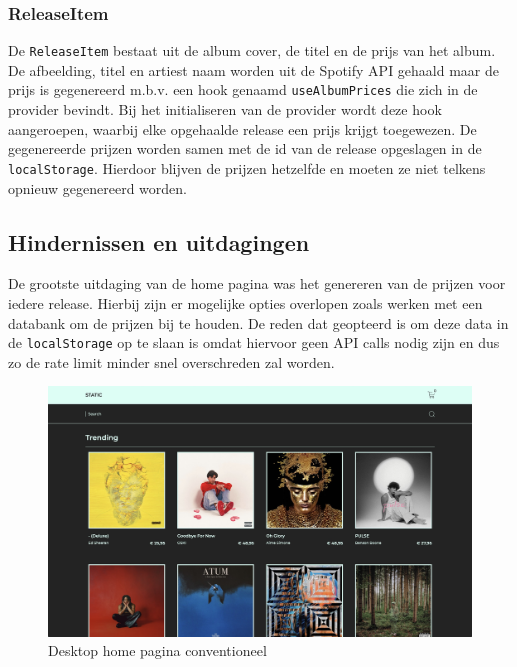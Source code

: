 \subsubsection{ReleaseItem}

De \texttt{ReleaseItem} bestaat uit de album cover, de titel en de prijs van het album. De afbeelding, titel en artiest naam worden uit de Spotify API gehaald maar de prijs is gegenereerd m.b.v. een hook genaamd \texttt{useAlbumPrices} die zich in de provider bevindt. Bij het initialiseren van de provider wordt deze hook aangeroepen, waarbij elke opgehaalde release een prijs krijgt toegewezen. De gegenereerde prijzen worden samen met de id van de release opgeslagen in de \texttt{localStorage}. Hierdoor blijven de prijzen hetzelfde en moeten ze niet telkens opnieuw gegenereerd worden.

\subsection{Hindernissen en uitdagingen}

De grootste uitdaging van de home pagina was het genereren van de prijzen voor iedere release. Hierbij zijn er mogelijke opties overlopen zoals werken met een databank om de prijzen bij te houden. De reden dat geopteerd is om deze data in de \texttt{localStorage} op te slaan is omdat hiervoor geen API calls nodig zijn en dus zo de rate limit minder snel overschreden zal worden.

\begin{figure}[h]
	\centering
	\includegraphics[width=1\linewidth]{graphics/desktopHomeConventioneel}
	\caption[Desktop home pagina conventioneel]{Desktop home pagina conventioneel}
	\label{fig:desktopHomeConventioneel}
\end{figure}

